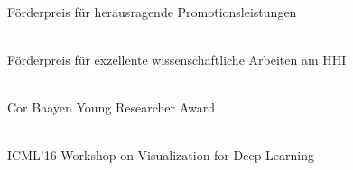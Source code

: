 {
    \ifdefined\shortcv
        {}
    \else
        {   \\
            F\"orderpreis f\"ur herausragende Promotionsleistungen
        }
    \fi
}


{
    \ifdefined\shortcv
        {}
    \else
        {   \\
            F\"orderpreis f\"ur exzellente wissenschaftliche Arbeiten am HHI
        }
    \fi
}


{
    \ifdefined\shortcv
        {}
    \else
        {   \\
            Cor Baayen Young Researcher Award
        }
    \fi
}


{
    \ifdefined\shortcv
        {}
    \else
        {   \\
            ICML'16 Workshop on Visualization for Deep Learning
        }
    \fi
}


